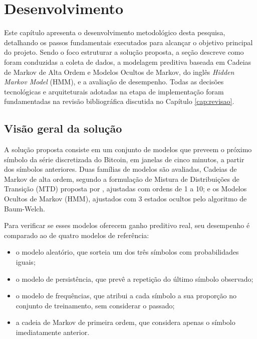 \documentclass[
    12pt,                %
    openright,           %
    oneside,             %
    a4paper,             %
    english,             %
    brazil               %
]{abntex2}
\begin{document}
\chapter{Desenvolvimento}
\label{cap:desenvolvimento}

Este capítulo apresenta o desenvolvimento metodológico desta pesquisa,
detalhando os passos fundamentais executados para alcançar o objetivo principal do projeto.
Sendo o foco estruturar a solução proposta, a seção descreve como foram conduzidas
a coleta de dados, a modelagem preditiva baseada em Cadeias de Markov de Alta Ordem
e Modelos Ocultos de Markov, do inglês \textit{Hidden Markov Model} (HMM), e a avaliação de desempenho. Todas as decisões
tecnológicas e arquiteturais adotadas na etapa de implementação foram fundamentadas
na revisão bibliográfica discutida no Capítulo \ref{cap:revisao}.

\section{Visão geral da solução}

A solução proposta consiste em um conjunto de modelos que preveem o próximo símbolo da série discretizada do Bitcoin, 
em janelas de cinco minutos, a partir dos símbolos anteriores. Duas famílias de modelos são avaliadas, Cadeias de Markov de alta ordem, 
segundo a formulação de Mistura de Distribuições de Transição (MTD) proposta por , 
ajustadas com ordens de 1 a 10; e os Modelos Ocultos de Markov (HMM), ajustados com 3 estados ocultos 
pelo algoritmo de Baum-Welch.

Para verificar se esses modelos oferecem ganho preditivo real, seu desempenho é 
comparado ao de quatro modelos de referência:

\begin{itemize}
    \item o modelo aleatório, que sorteia um dos três símbolos com probabilidades iguais;
    \item o modelo de persistência, que prevê a repetição do último símbolo observado;
    \item o modelo de frequências, que atribui a cada símbolo a sua proporção no conjunto de treinamento, sem considerar o passado;
    \item a cadeia de Markov de primeira ordem, que considera apenas o símbolo imediatamente anterior.
\end{itemize}
\end{document}

